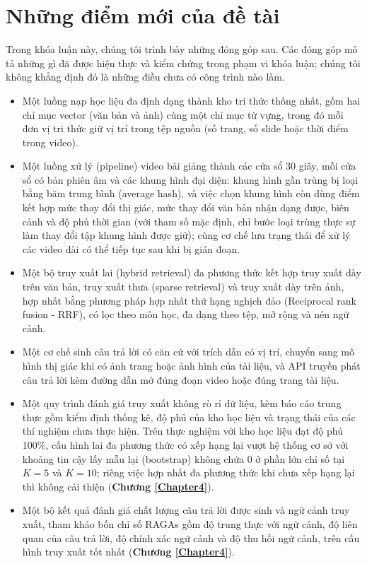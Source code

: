 
\section{Những điểm mới của đề tài}

Trong khóa luận này, chúng tôi trình bày những đóng góp sau. Các đóng góp mô tả những gì đã được hiện thực và kiểm chứng trong phạm vi khóa luận; chúng tôi không khẳng định đó là những điều chưa có công trình nào làm.

\begin{itemize}
    \item Một luồng nạp học liệu đa định dạng thành kho tri thức thống nhất, gồm hai chỉ mục vector (văn bản và ảnh) cùng một chỉ mục từ vựng, trong đó mỗi đơn vị tri thức giữ vị trí trong tệp nguồn (số trang, số slide hoặc thời điểm trong video).
    \item Một luồng xử lý (pipeline) video bài giảng thành các cửa sổ 30 giây, mỗi cửa sổ có bản phiên âm và các khung hình đại diện: khung hình gần trùng bị loại bằng băm trung bình (average hash), và việc chọn khung hình còn dùng điểm kết hợp mức thay đổi thị giác, mức thay đổi văn bản nhận dạng được, biên cảnh và độ phủ thời gian (với tham số mặc định, chỉ bước loại trùng thực sự làm thay đổi tập khung hình được giữ); cùng cơ chế lưu trạng thái để xử lý các video dài có thể tiếp tục sau khi bị gián đoạn.
    \item Một bộ truy xuất lai (hybrid retrieval) đa phương thức kết hợp truy xuất dày trên văn bản, truy xuất thưa (sparse retrieval) và truy xuất dày trên ảnh, hợp nhất bằng phương pháp hợp nhất thứ hạng nghịch đảo (Reciprocal rank fusion - RRF), có lọc theo môn học, đa dạng theo tệp, mở rộng và nén ngữ cảnh.
    \item Một cơ chế sinh câu trả lời có căn cứ với trích dẫn có vị trí, chuyển sang mô hình thị giác khi có ảnh trang hoặc ảnh hình của tài liệu, và API truyền phát câu trả lời kèm đường dẫn mở đúng đoạn video hoặc đúng trang tài liệu.
    \item Một quy trình đánh giá truy xuất không rò rỉ dữ liệu, kèm báo cáo trung thực gồm kiểm định thống kê, độ phủ của kho học liệu và trạng thái của các thí nghiệm chưa thực hiện. Trên thực nghiệm với kho học liệu đạt độ phủ 100\%, cấu hình lai đa phương thức có xếp hạng lại vượt hệ thống cơ sở với khoảng tin cậy lấy mẫu lại (bootstrap) không chứa 0 ở phần lớn chỉ số tại $K = 5$ và $K = 10$; riêng việc hợp nhất đa phương thức khi chưa xếp hạng lại thì không cải thiện (\textbf{Chương \ref{Chapter4}}).
    \item Một bộ kết quả đánh giá chất lượng câu trả lời được sinh và ngữ cảnh truy xuất, tham khảo bốn chỉ số RAGAs gồm độ trung thực với ngữ cảnh, độ liên quan của câu trả lời, độ chính xác ngữ cảnh và độ thu hồi ngữ cảnh, trên cấu hình truy xuất tốt nhất (\textbf{Chương \ref{Chapter4}}).
\end{itemize}


